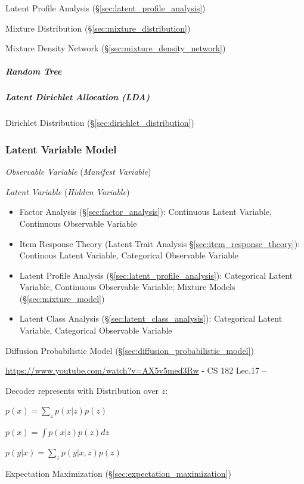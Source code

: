 \fist Latent Profile Analysis (\S\ref{sec:latent_profile_analysis})

Mixture Distribution (\S\ref{sec:mixture_distribution})

Mixture Density Network (\S\ref{sec:mixture_density_network})



\subparagraph{Random Tree}\label{sec:random_tree}\hfill

\subparagraph{Latent Dirichlet Allocation (LDA)}
\label{sec:latent_dirichlet}\hfill

Dirichlet Distribution (\S\ref{sec:dirichlet_distribution})



\subsubsection{Latent Variable Model}\label{sec:latent_variable_model}

\emph{Observable Variable} (\emph{Manifest Variable})

\emph{Latent Variable} (\emph{Hidden Variable})

\begin{itemize}
  \item Factor Analysis (\S\ref{sec:factor_analysis}): Continuous Latent
    Variable, Continuous Observable Variable
  \item Item Response Theory (Latent Trait Analysis
    \S\ref{sec:item_response_theory}): Continous Latent Variable, Categorical
    Observable Variable
  \item Latent Profile Analysis (\S\ref{sec:latent_profile_analysis}):
    Categorical Latent Variable, Continuous Observable Variable; Mixture Models
    (\S\ref{sec:mixture_model})
  \item Latent Class Analysis (\S\ref{sec:latent_class_analysis}): Categorical
    Latent Variable, Categorical Observable Variable
\end{itemize}

Diffusion Probabilistic Model (\S\ref{sec:diffusion_probabilistic_model})

\url{https://www.youtube.com/watch?v=AX5v5med3Rw} - CS 182 Lec.17 --

Decoder represents with Distribution over $z$:

$p(x) = \sum_z p(x|z)p(z)$

$p(x) = \int p(x|z)p(z) dz$

$p(y|x) = \sum_zp(y|x,z)p(z)$

Expectation Maximization (\S\ref{sec:expectation_maximization})

